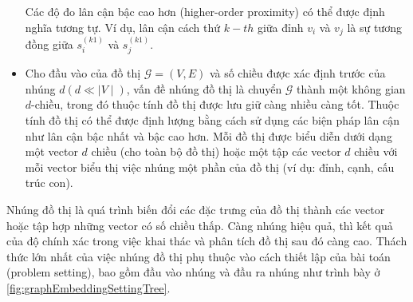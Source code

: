 \begin{itemize}
	Các độ đo lân cận bậc cao hơn (higher-order proximity) có thể được định nghĩa tương tự. Ví dụ, lân cận cách thứ $k-th$ giữa đỉnh $v_i$ và $v_j$ là sự tương đồng giữa $s^{(k 1)}_i$ và $s^{(k 1)}_j$.
	
	\item
	\begin{definition}\label{def:graphEmbedding}
		Cho đầu vào của đồ thị \(\mathcal{G} = (V, E)\) và số chiều được xác định trước của nhúng $d (d \ll \mid V \mid)$, vấn đề nhúng đồ thị là chuyển $\mathcal{G}$ thành một không gian \(d\)-chiều, trong đó thuộc tính đồ thị được lưu giữ càng nhiều càng tốt. Thuộc tính đồ thị có thể được định lượng bằng cách sử dụng các biện pháp lân cận như lân cận bậc nhất và bậc cao hơn. Mỗi đồ thị được biểu diễn dưới dạng một vector $d$ chiều (cho toàn bộ đồ thị) hoặc một tập các vector $d$ chiều với mỗi vector biểu thị việc nhúng một phần của đồ thị (ví dụ: đỉnh, cạnh, cấu trúc con).
	\end{definition}
\end{itemize}

Nhúng đồ thị là quá trình biến đổi các đặc trưng của đồ thị thành các vector hoặc tập hợp những vector có số chiều thấp. Càng nhúng hiệu quả, thì kết quả của độ chính xác trong việc khai thác và phân tích đồ thị sau đó càng cao. Thách thức lớn nhất của việc nhúng đồ thị phụ thuộc vào cách thiết lập của bài toán (problem setting), bao gồm đầu vào nhúng và đầu ra nhúng như trình bày ở \autoref{fig:graphEmbeddingSettingTree}.

